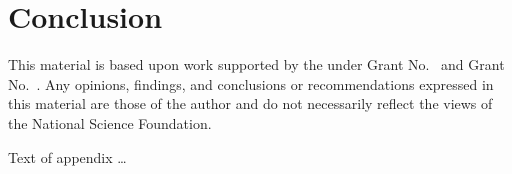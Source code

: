 \documentclass[acmsmall,review,anonymous]{acmart}\settopmatter{printfolios=true,printccs=false,printacmref=false}
\begin{document}
\section{Conclusion}


\begin{acks}                            %
	This material is based upon work supported by the
	 under Grant
	No.~ and Grant
	No.~.  Any opinions, findings, and
	conclusions or recommendations expressed in this material are those
	of the author and do not necessarily reflect the views of the
	National Science Foundation.
\end{acks}






Text of appendix \ldots
\end{document}
